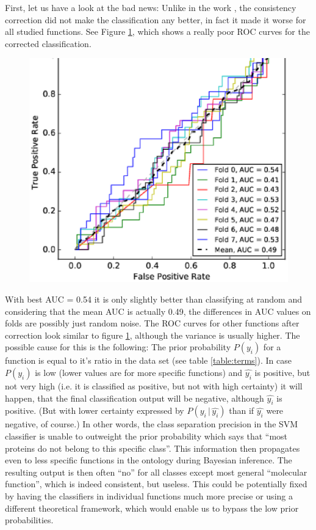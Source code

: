 \documentclass[11pt,twoside,a4paper]{book}
\begin{document}
First, let us have a look at the bad news: 
Unlike in the work \cite{bnet},
the consistency correction did not make the classification 
any better,
in fact it made it worse for all studied functions.
See Figure \ref{fig:roc_corrected}, which shows a really poor ROC curves
for the corrected classification.
\begin{figure}[h]\begin{center}\includegraphics[width=0.5\linewidth]{figures/binding-corrected}\label{fig:roc_corrected}\end{center}\end{figure}
With best AUC = 0.54 it is only slightly better than classifying at random
and considering that the mean AUC is actually 0.49,
the differences in AUC values on folds are possibly just random noise.
The ROC curves for other functions after correction look similar to figure \ref{fig:roc_corrected}, although the variance is usually higher.
The possible cause for this is the following:
The prior probability $P(y_i)$ for a function is equal to it's ratio in the data set (see table \ref{table:terms}).
In case $P(y_i)$ is low (lower values are for more specific functions) and $\hat{y_i}$ is positive, but not very high
(i.e. it is classified as positive, but not with high certainty)
it will happen, that the final classification output will be negative,
although $\hat{y_i}$ is positive.
(But with lower certainty expressed by $P(y_i\, | \, \hat{y_i})$ than if $\hat{y_i}$ were negative, of course.)
In other words, the class separation precision in the SVM classifier 
is unable to outweight the prior probability which says that ``most proteins do not belong to this specific class''.
This information then propagates even to less specific functions in the ontology during Bayesian inference.
The resulting output is then often ``no'' for all classes except most general ``molecular function'',
which is indeed consistent, but useless.
This could be potentially fixed by having the classifiers in individual functions much more precise
or using a different theoretical framework, which would enable us to bypass the low prior probabilities.
\end{document}
